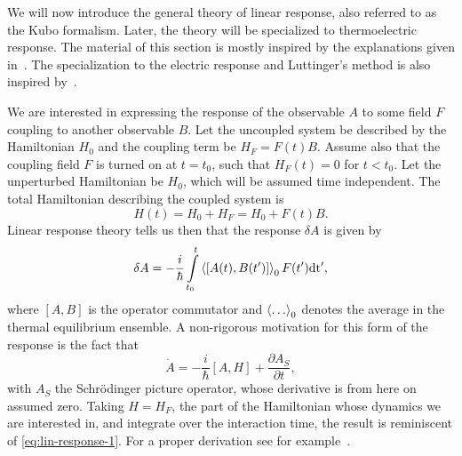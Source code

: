 We will now introduce the general theory of linear response, also referred to as the Kubo formalism.
Later, the theory will be specialized to thermoelectric response.
The material of this section is mostly inspired by the explanations given in~\textcite{giulianiQuantumTheoryElectron2005}.
The specialization to the electric response and Luttinger's method is also inspired by~\textcite{mahanManyparticlePhysics2000}.

We are interested in expressing the response of the observable ${A}$ to some field $F$ coupling to another observable ${B}$.
Let the uncoupled system be described by the Hamiltonian $H_{0}$ and the coupling term be $H_F = F(t) {B}$.
Assume also that the coupling field $F$ is turned on at $t=t_0$,  such that $H_F(t) = 0$ for $t < t_0$.
Let the unperturbed Hamiltonian be $H_0$, which will be assumed time independent.
The total Hamiltonian describing the coupled system is
\begin{equation}
  \label{eq:kubo-perturbation}
{H}(t) = H_0 + H_F = H_0+ F(t) {B}.
\end{equation}
Linear response theory tells us then that the response $\delta {A}$ is given by~\cite{giulianiQuantumTheoryElectron2005}
\begin{equation}\label{eq:lin-response-1}
  \delta {A} = -\frac{i}{\hbar} \int\limits_{t_0}^t
  \Braket{\left[
{A}(t), {B}(t')
\right]}_{0}
F(t') \mathrm{dt'},
\end{equation}
where $[{A}, {B}]$ is the operator commutator and $\braket{\dots}_0$ denotes the average in the thermal equilibrium ensemble.
A  non-rigorous motivation for this form of the response is the fact that
\begin{equation}
  \dot{{A}} = -\frac{i}{\hbar } \left[ {A}, H \right]
  + \frac{\partial {A}_{S}}{\partial t}, 
\end{equation}
with $A_S$ the Schrödinger picture operator, whose derivative is from here on assumed zero.
Taking $H=H_F$, the part of the Hamiltonian whose dynamics we are interested in, and integrate over the interaction time, the result is reminiscent of \cref{eq:lin-response-1}.
For a proper derivation see for example~\textcite[Chapter 3.3]{giulianiQuantumTheoryElectron2005}.

